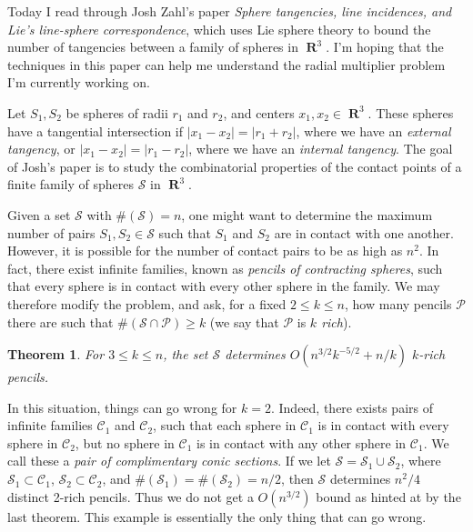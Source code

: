 \documentclass[openany,nobib,nols,a4paper,twoside,symmetric,justified,notoc]{tufte-book}
\theoremstyle{plain}
\newtheorem{theorem}{Theorem}[chapter]
\theoremstyle{remark}
\theoremstyle{definition}
\DeclareMathOperator{\RR}{\mathbf{R}}
\begin{document}
Today I read through Josh Zahl's paper \emph{Sphere tangencies, line incidences, and Lie's line-sphere correspondence}, which uses Lie sphere theory to bound the number of tangencies between a family of spheres in $\RR^3$. I'm hoping that the techniques in this paper can help me understand the radial multiplier problem I'm currently working on.

Let $S_1,S_2$ be spheres of radii $r_1$ and $r_2$, and centers $x_1,x_2 \in \RR^3$. These spheres have a tangential intersection if $|x_1 - x_2| = |r_1 + r_2|$, where we have an \emph{external tangency}, or $|x_1 - x_2| = |r_1 - r_2|$, where we have an \emph{internal tangency}. The goal of Josh's paper is to study the combinatorial properties of the contact points of a finite family of spheres $\mathcal{S}$ in $\RR^3$.

Given a set $\mathcal{S}$ with $\#(\mathcal{S}) = n$, one might want to determine the maximum number of pairs $S_1,S_2 \in \mathcal{S}$ such that $S_1$ and $S_2$ are in contact with one another. However, it is possible for the number of contact pairs to be as high as $n^2$. In fact, there exist infinite families, known as \emph{pencils of contracting spheres}, such that every sphere is in contact with every other sphere in the family. We may therefore modify the problem, and ask, for a fixed $2 \leq k \leq n$, how many pencils $\mathcal{P}$ there are such that $\#(\mathcal{S} \cap \mathcal{P}) \geq k$ (we say that $\mathcal{P}$ is \emph{$k$ rich}).

\begin{theorem}
    For $3 \leq k \leq n$, the set $\mathcal{S}$ determines $O(n^{3/2} k^{-5/2} + n/k)$ $k$-rich pencils.
\end{theorem}

In this situation, things can go wrong for $k = 2$. Indeed, there exists pairs of infinite families $\mathcal{C}_1$ and $\mathcal{C}_2$, such that each sphere in $\mathcal{C}_1$ is in contact with every sphere in $\mathcal{C}_2$, but no sphere in $\mathcal{C}_1$ is in contact with any other sphere in $\mathcal{C}_1$. We call these a \emph{pair of complimentary conic sections}. If we let $\mathcal{S} = \mathcal{S}_1 \cup \mathcal{S}_2$, where $\mathcal{S}_1 \subset \mathcal{C}_1$, $\mathcal{S}_2 \subset \mathcal{C}_2$, and $\#(\mathcal{S}_1) = \#(\mathcal{S}_2) = n/2$, then $\mathcal{S}$ determines $n^2/4$ distinct 2-rich pencils. Thus we do not get a $O(n^{3/2})$ bound as hinted at by the last theorem. This example is essentially the only thing that can go wrong.
\end{document}
